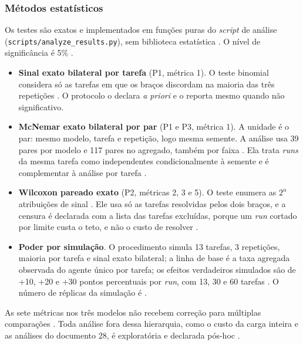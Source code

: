 \begin{novobloco}
\subsubsection{Métodos estatísticos}

Os testes são exatos e implementados em funções puras do \textit{script} de análise (\texttt{scripts/analyze\_results.py}), sem biblioteca estatística . O nível de significância é 5\% .

\begin{itemize}
    \item \textbf{Sinal exato bilateral por tarefa} (P1, métrica 1). O teste binomial considera só as tarefas em que os braços discordam na maioria das três repetições . O protocolo o declara \textit{a priori} e o reporta mesmo quando não significativo.
    \item \textbf{McNemar exato bilateral por par} (P1 e P3, métrica 1). A unidade é o par: mesmo modelo, tarefa e repetição, logo mesma semente. A análise usa 39 pares por modelo e 117 pares no agregado, também por faixa . Ela trata \textit{runs} da mesma tarefa como independentes condicionalmente à semente e é complementar à análise por tarefa .
    \item \textbf{Wilcoxon pareado exato} (P2, métricas 2, 3 e 5). O teste enumera as $2^n$ atribuições de sinal . Ele usa só as tarefas resolvidas pelos dois braços, e a censura é declarada com a lista das tarefas excluídas, porque um \textit{run} cortado por limite custa o teto, e não o custo de resolver .
    \item \textbf{Poder por simulação}. O procedimento simula 13 tarefas, 3 repetições, maioria por tarefa e sinal exato bilateral; a linha de base é a taxa agregada observada do agente único por tarefa; os efeitos verdadeiros simulados são de +10, +20 e +30 pontos percentuais por \textit{run}, com 13, 30 e 60 tarefas . O número de réplicas da simulação é \pedir{}.
\end{itemize}

As sete métricas nos três modelos não recebem correção para múltiplas comparações . Toda análise fora dessa hierarquia, como o custo da carga inteira e as análises do documento 28, é exploratória e declarada pós-hoc .
\end{novobloco}

